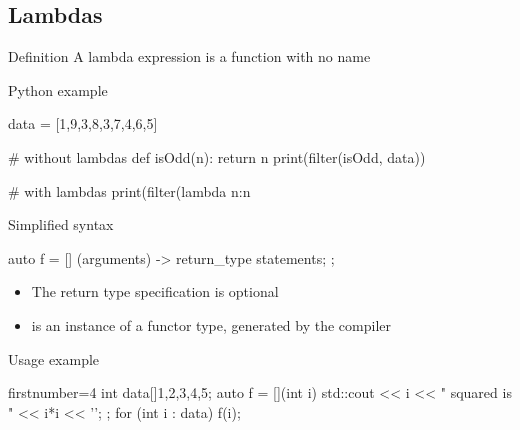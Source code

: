 \subsection[$\lambda$]{Lambdas}

\begin{frame}[fragile]
  \begin{block}{Definition}
    A lambda expression is a function with no name
  \end{block}
  \pause
  \begin{exampleblock}{Python example}
    \begin{pythoncode*}{}
      data = [1,9,3,8,3,7,4,6,5]

      # without lambdas
      def isOdd(n):
        return n%
      print(filter(isOdd, data))

      # with lambdas
      print(filter(lambda n:n%
    \end{pythoncode*}
  \end{exampleblock}
\end{frame}

\begin{frame}[fragile]
  \begin{block}{Simplified syntax}
    \begin{cppcode*}{}
      auto f = [] (arguments) -> return_type {
        statements;
      };
    \end{cppcode*}
    \begin{itemize}
    \item The return type specification is optional
    \item {} is an instance of a functor type, generated by the compiler
    \end{itemize}
  \end{block}
  \begin{exampleblock}{Usage example}
    \begin{cppcode*}{firstnumber=4}
      int data[]{1,2,3,4,5};
      auto f = [](int i) {
        std::cout << i << " squared is " << i*i << '\n';
      };
      for (int i : data) f(i);
    \end{cppcode*}
  \end{exampleblock}
\end{frame}

